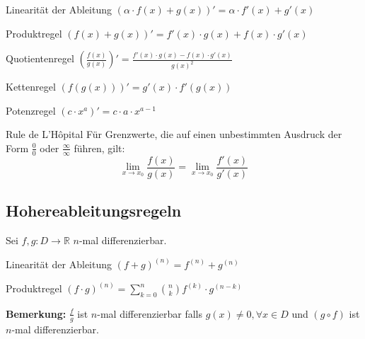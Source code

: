 \documentclass[a4paper,8pt]{extarticle}
\newenvironment{bemerkung}{
   \noindent \textbf{Bemerkung:  }}{}
\def\R{\mathbb{R}}
\begin{document}
\begin{subbox}{Linearität der Ableitung}
 $(\alpha \cdot f(x) + g(x))' = \alpha \cdot f'(x) + g'(x)$
\end{subbox}

\begin{mainbox}{Produktregel}
 $(f(x) + g(x))' = f'(x) \cdot g(x) + f(x) \cdot g'(x)$
\end{mainbox}

\begin{mainbox}{Quotientenregel}
 $\left(\frac{f(x)}{g(x)}\right)' = \frac{f'(x) \cdot g(x) - f(x) \cdot g'(x)}{g(x)^2}$
\end{mainbox}

\begin{mainbox}{Kettenregel}
 $(f(g(x)))' = g'(x) \cdot f'(g(x))$
\end{mainbox}

\begin{subbox}{Potenzregel}
 $(c \cdot x^a)' = c \cdot a \cdot x^{a - 1}$
\end{subbox}

\begin{mainbox}{Rule de L'Hôpital}
Für Grenzwerte, die auf einen unbestimmten Ausdruck der Form $\frac{0}{0}$ oder $\frac{\infty}{\infty}$ führen, gilt:
\begin{equation*}
  \lim_{x\to x_0} \frac{f(x)}{g(x)} = \lim_{x\to x_0} \frac{f'(x)}{g'(x)}
\end{equation*}
\end{mainbox}

\subsection{Hohereableitungsregeln}
Sei $f, g: D \to \R$ $n$-mal differenzierbar.
\begin{subbox}{Linearität der Ableitung}
  $(f + g) ^{(n)} = f^{(n)} + g^{(n)}$
 \end{subbox}
\begin{mainbox}{Produktregel}
  $(f \cdot g)^{(n)} = \sum_{k=0}^n {n \choose k} f^{(k)} \cdot g^{(n-k)}$
 \end{mainbox}
 \begin{bemerkung}
   $\frac{f}{g}$ ist $n$-mal differenzierbar falls $g(x) \neq 0, \forall x \in D$ und $(g \circ f)$ ist $n$-mal differenzierbar.
 \end{bemerkung}
\end{document}
